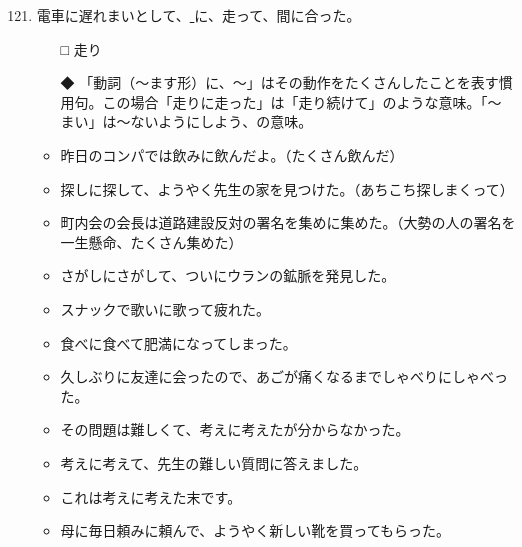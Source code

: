 \documentclass[
uplatex,
b5paper,
10pt,
dvipdfmx
]{jsbook}
\begin{document}
\begin{enumerate}
\setcounter{enumi}{120}
\item 電車に遅れまいとして、\underline{    }に、走って、間に合った。
\begin{itemize}
\item[□] 走り
\item[◆] 「動詞（〜ます形）に、〜」はその動作をたくさんしたことを表す慣
	  用句。この場合「走りに走った」は「走り続けて」のような意味。「〜
	  まい」は〜ないようにしよう、の意味。
\end{itemize}
\begin{itemize}
\item 昨日のコンパでは飲みに飲んだよ。（たくさん飲んだ）
\item 探しに探して、ようやく先生の家を見つけた。（あちこち探しまくって）
\item 町内会の会長は道路建設反対の署名を集めに集めた。（大勢の人の署名を
      一生懸命、たくさん集めた）
\item さがしにさがして、ついにウランの鉱脈を発見した。
\item スナックで歌いに歌って疲れた。
\item 食べに食べて肥満になってしまった。
\item 久しぶりに友達に会ったので、あごが痛くなるまでしゃべりにしゃべった。
\item その問題は難しくて、考えに考えたが分からなかった。
\item 考えに考えて、先生の難しい質問に答えました。
\item これは考えに考えた末です。
\item 母に毎日頼みに頼んで、ようやく新しい靴を買ってもらった。
\end{itemize}


\end{enumerate}
\end{document}
